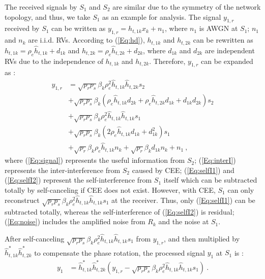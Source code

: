 \documentclass[onecolumn,letterpaper,11pt,draftclsnofoot]{IEEEtran}
\begin{document}
The received signals by $S_1$ and $S_2$ are similar due to the
symmetry of the network topology, and thus, we take $S_1$ as an
example for analysis. The signal $y_{1,r}$ received by $S_1$ can be
written as $y_{1,r} = h_{t,1k} x_k  + n_1$, where $n_1$ is AWGN at
$S_1$; $n_1$ and $n_k$ are i.i.d. RVs. According to (\ref{Eq:hd}),
$h_{t,1k}$ and $h_{t,2k}$ can be rewritten as $ h_{t,1k}  = \rho _e
\hat h_{t,1k} + d_{1k}$ and $ h_{t,2k}  = \rho _e \hat h_{t,2k}  +
d_{2k}$, where $d_{1k}$ and $d_{2k}$ are independent RVs due to the
independence of $ h_{t,1k} $ and $ h_{t,2k} $. Therefore, $y_{1,r}$
can be expanded as :
\begin{align}
 y_{1,r}  &= \sqrt {p_r p_s } \beta_k \rho _e^2 \hat h_{t,1k} \hat h_{t,2k} s_2  \label{Eq:signal}\\
 &+ \sqrt {p_r p_s } \beta_k \left(\rho _e \hat h_{t,1k} d_{2k}  + \rho _e \hat h_{t,2k} d_{1k}  + d_{1k} d_{2k} \right)s_2  \label{Eq:interI}\\
 &+ \sqrt {p_r p_s } \beta_k \rho _e^2 \hat h_{t,1k} \hat h_{t,1k} s_1\label{Eq:selfI1}\\
 &+ \sqrt {p_r p_s } \beta_k \left(2\rho _e \hat h_{t,1k} d_{1k}  + d_{1k}^2 \right)s_1  \label{Eq:selfI2}\\
 &+ \sqrt {p_r } \beta_k \rho _e \hat h_{t,1k} n_k  + \sqrt {p_r } \beta_k d_{1k} n_k  +
 n_1~,
 \label{Eq:noise}~
\end{align}
where (\ref{Eq:signal}) represents the useful information from
$S_2$; (\ref{Eq:interI}) represents the inter-interference from
$S_2$ caused by CEE; (\ref{Eq:selfI1}) and (\ref{Eq:selfI2})
represent the self-interference from $S_1$ itself which can be
subtracted totally by self-canceling if CEE does not
exist\cite{Song2011}. However, with CEE, $S_1$ can only reconstruct
$\sqrt {p_r p_s } \beta_k \rho _e^2 \hat h_{t,1k} \hat h_{t,1k} s_1$
at the receiver. Thus, only (\ref{Eq:selfI1}) can be subtracted
totally, whereas the self-interference of (\ref{Eq:selfI2}) is
residual; (\ref{Eq:noise}) includes the amplified noise from $R_k$
and the noise at $S_1$.

After self-canceling $\sqrt {p_r p_s } \beta_k \rho _e^2 \hat
h_{t,1k} \hat h_{t,1k} s_1$ from $y_{1,r}$, and then multiplied by
$\hat h_{t,1k}^* \hat h_{t,2k}^* $ to compensate the phase rotation,
the processed signal $y_1$ at $S_1$ is :
\begin{align}\label{Eq:y1}
y_1&=\hat h_{t,1k}^* \hat h_{t,2k}^* \left( y_{1,r} - \sqrt {p_r p_s
} \beta_k \rho _e^2 \hat h_{t,1k} \hat h_{t,1k} s_1\right)~.
\end{align}
\end{document}
